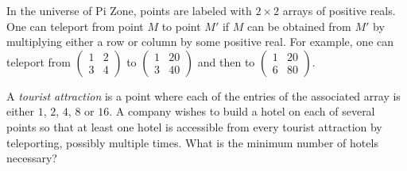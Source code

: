 In the universe of Pi Zone, points are labeled with $2 \times 2$ arrays of positive reals. One can teleport from point $M$ to point $M'$ if $M$ can be obtained from $M'$ by multiplying either a row or column by some positive real. For example, one can teleport from $\left( \begin{array}{cc} 1 & 2 \\ 3 & 4 \end{array} \right)$ to $\left( \begin{array}{cc} 1 & 20 \\ 3 & 40 \end{array} \right)$ and then to $\left( \begin{array}{cc} 1 & 20 \\ 6 & 80 \end{array} \right)$.

A \emph{tourist attraction} is a point where each of the entries of the associated array is either $1$, $2$, $4$, $8$ or $16$.  A company wishes to build a hotel on each of several points so that at least one hotel is accessible from every tourist attraction by teleporting, possibly multiple times. What is the minimum number of hotels necessary?

